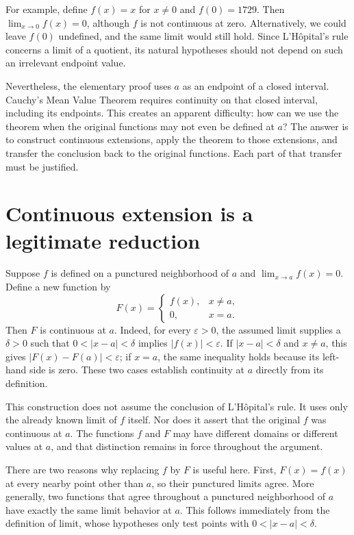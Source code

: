 \documentclass{essay}
\begin{document}
For example, define \(f(x)=x\) for \(x\ne0\) and \(f(0)=1729\). Then
\(\lim_{x\to0}f(x)=0\), although \(f\) is not continuous at zero. Alternatively,
we could leave \(f(0)\) undefined, and the same limit would still hold. Since
L'H\^opital's rule concerns a limit of a quotient, its natural hypotheses
should not depend on such an irrelevant endpoint value.

Nevertheless, the elementary proof uses \(a\) as an endpoint of a closed
interval. Cauchy's Mean Value Theorem requires continuity on that closed
interval, including its endpoints. This creates an apparent difficulty:
how can we use the theorem when the original functions may not even be
defined at \(a\)? The answer is to construct continuous extensions, apply
the theorem to those extensions, and transfer the conclusion back to the
original functions. Each part of that transfer must be justified.

\section{Continuous extension is a legitimate reduction}

Suppose \(f\) is defined on a punctured neighborhood of \(a\) and
\(\lim_{x\to a}f(x)=0\). Define a new function by
\[
  F(x)=
  \begin{cases}
    f(x),&x\ne a,\\
    0,&x=a.
  \end{cases}
\]
Then \(F\) is continuous at \(a\). Indeed, for every \(\varepsilon>0\), the
assumed limit supplies a \(\delta>0\) such that
\(0<|x-a|<\delta\) implies \(|f(x)|<\varepsilon\). If \(|x-a|<\delta\) and
\(x\ne a\), this gives \(|F(x)-F(a)|<\varepsilon\); if \(x=a\), the same
inequality holds because its left-hand side is zero. These two cases
establish continuity at \(a\) directly from its definition.

This construction does not assume the conclusion of L'H\^opital's rule.
It uses only the already known limit of \(f\) itself. Nor does it assert that
the original \(f\) was continuous at \(a\). The functions \(f\) and \(F\) may have
different domains or different values at \(a\), and that distinction remains
in force throughout the argument.

There are two reasons why replacing \(f\) by \(F\) is useful here. First,
\(F(x)=f(x)\) at every nearby point other than \(a\), so their punctured limits
agree. More generally, two functions that agree throughout a punctured
neighborhood of \(a\) have exactly the same limit behavior at \(a\). This
follows immediately from the definition of limit, whose hypotheses only
test points with \(0<|x-a|<\delta\).
\end{document}
